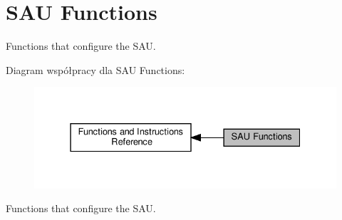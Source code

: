 \hypertarget{group___c_m_s_i_s___core___s_a_u_functions}{}\section{S\+AU Functions}
\label{group___c_m_s_i_s___core___s_a_u_functions}


Functions that configure the S\+AU.  


Diagram współpracy dla S\+AU Functions\+:\nopagebreak
\begin{figure}[H]
\begin{center}
\leavevmode
\includegraphics[width=331pt]{group___c_m_s_i_s___core___s_a_u_functions}
\end{center}
\end{figure}
Functions that configure the S\+AU. 

